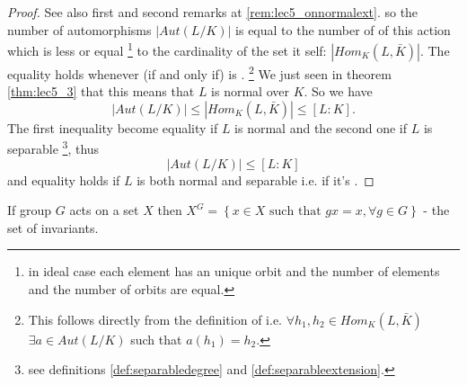 \begin{theorem}
\begin{proof}
{      See also first and second remarks at \ref{rem:lec5_onnormalext}.
    }
    so the number of 
    automorphisms $\left|Aut\left(L/K\right)\right|$ is equal to the
    number of  of this action which is less or
    equal
    \footnote{
      in ideal case each element has an unique orbit and the number of
      elements and the number of orbits are equal.
    }
    to the cardinality of the set it self:
    $\left|Hom_K\left(L, \bar{K}\right)\right|$. The equality holds
    whenever (if and only if)  is
    .
    \footnote{
      This follows directly from the definition of
       i.e. $\forall h_1, h_2 \in
      Hom_K\left(L, \bar{K}\right)$ $\exists a \in
      Aut\left(L/K\right)$  such that $a(h_1) = h_2$.
    }
    We just seen in 
    theorem \ref{thm:lec5_3} that this means that $L$ is normal over
    $K$. So we have
    \[
    \left|Aut\left(L/K\right)\right| \le
    \left|Hom_K\left(L, \bar{K}\right)\right| \le
    \left[L:K\right].
    \]
    The first inequality become equality if $L$ is normal and the
    second one if $L$ is separable
    \footnote{
      see definitions \ref{def:separabledegree} and
      \ref{def:separableextension}. 
    }, thus
    \[
    \left|Aut\left(L/K\right)\right| \le \left[L:K\right]
    \]
    and equality holds if $L$ is both normal and separable i.e. if
    it's .
  \end{proof}
\end{theorem}

\begin{definition}
  If group $G$ acts on a set $X$ then $X^G = \left\{x
  \in X \mbox{ such that } gx = x, \forall g \in G\right\}$ - the
  set of invariants.
  \label{def:setinvariants}
\end{definition}

